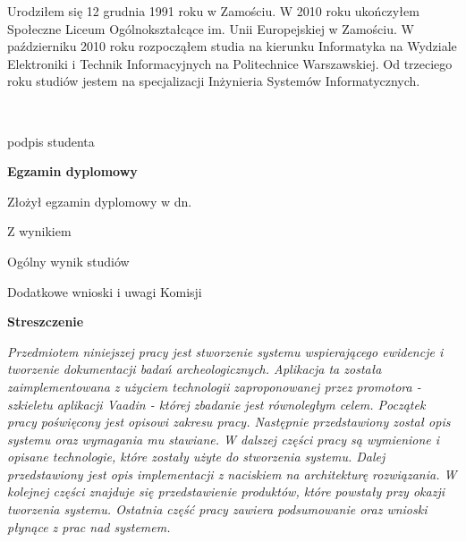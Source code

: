 \begin{titlepage}
    \indent
    Urodziłem się 12 grudnia 1991 roku w Zamościu. W 2010 roku ukończyłem Społeczne Liceum Ogólnokształcące im. Unii Europejskiej w Zamościu. W październiku 2010 roku rozpocząłem studia na kierunku Informatyka na Wydziale Elektroniki i Technik Informacyjnych na Politechnice Warszawskiej. Od trzeciego roku studiów jestem na specjalizacji Inżynieria Systemów Informatycznych.
    \par
    \vspace{2\baselineskip}
    \hfill\parbox{15em}{{\small\dotfill}\\[-.3ex]
    \centerline{\footnotesize podpis studenta}}\par
    \vspace{1\baselineskip}
    \begin{center}
 	{\large\bfseries Egzamin dyplomowy} \par\bigskip\bigskip
    \end{center}
    \par\noindent\vspace{1.5\baselineskip}
    Złożył egzamin dyplomowy w dn. \dotfill
    \par\noindent\vspace{1.5\baselineskip}
    Z wynikiem \dotfill
    \par\noindent\vspace{1.5\baselineskip}
    Ogólny wynik studiów \dotfill
    \par\noindent\vspace{1.5\baselineskip}
    Dodatkowe wnioski i uwagi Komisji \dotfill
    \par\noindent\vspace{1.5\baselineskip}
    \dotfill

    \newpage\thispagestyle{empty}
    \vspace*{2\baselineskip}
    \begin{center}
	{\large\bfseries Streszczenie}\par\bigskip
    \end{center}

    {\itshape
    Przedmiotem niniejszej pracy jest stworzenie systemu wspierającego ewidencje i tworzenie dokumentacji badań archeologicznych. Aplikacja ta została zaimplementowana z użyciem technologii zaproponowanej przez promotora - szkieletu aplikacji Vaadin - której zbadanie jest równoległym celem. Początek pracy poświęcony jest opisowi zakresu pracy. Następnie przedstawiony został opis systemu oraz wymagania mu stawiane. W dalszej części pracy są wymienione i opisane technologie, które zostały użyte do stworzenia systemu. Dalej przedstawiony jest opis implementacji z naciskiem na architekturę rozwiązania. W kolejnej części znajduje się przedstawienie produktów, które powstały przy okazji tworzenia systemu. Ostatnia część pracy zawiera podsumowanie oraz wnioski płynące z prac nad systemem.}
    \vspace*{1\baselineskip}


\end{titlepage}
